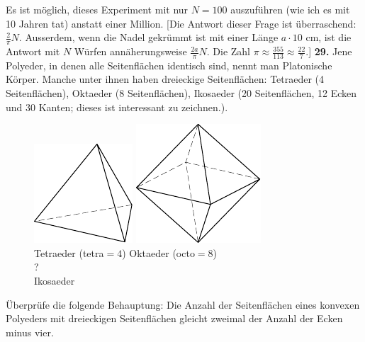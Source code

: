 \documentclass[12pt]{article} %
\begin{document}
Es ist möglich, dieses Experiment mit nur $N=100$ auszuführen (wie ich es mit 10 Jahren tat) anstatt einer Million. [Die Antwort dieser Frage ist überraschend: $\frac2{\pi}N$. Ausserdem, wenn die Nadel gekrümmt ist mit einer Länge $a \cdot 10$ cm, ist die Antwort mit $N$ Würfen annäherungsweise $\frac{2a}{\pi}N$. 
Die Zahl $\pi \approx \frac{355}{113} \approx \frac{22}7.$]
\newline\newline\quad
{\bf 29.} Jene Polyeder, in denen alle Seitenflächen identisch sind, nennt man Platonische Körper. Manche unter ihnen haben dreieckige Seitenflächen: Tetraeder (4 Seitenflächen), Oktaeder (8 Seitenflächen), Ikosaeder (20 Seitenflächen, 12 Ecken und 30 Kanten; dieses ist interessant zu zeichnen.). 
\begin{figure}[h!]
\centering
\footnotesize
\hspace{5pt}
\includegraphics[scale=1]{taskbook-131}\hspace{68pt}
\includegraphics[scale=1]{taskbook-132}\\ \vspace{3pt}
Tetraeder (tetra${}= 4$) \hspace{40pt}
Oktaeder (octo${}= 8$)\\[25pt]
{\Huge 
?}\\ Ikosaeder\vspace{3pt}
\end{figure}
Überprüfe die folgende Behauptung: Die Anzahl der Seitenflächen eines konvexen Polyeders mit dreieckigen Seitenflächen gleicht zweimal der Anzahl der Ecken minus vier. 
\newpage
\noindent
\end{document}
